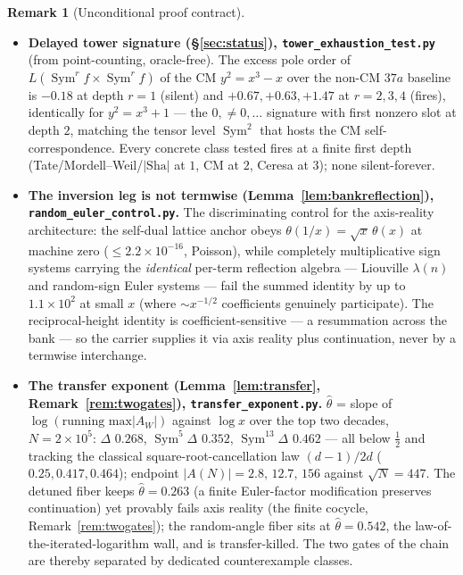 \documentclass[11pt]{article}
\theoremstyle{definition}
\newtheorem{remark}[theorem]{Remark}
\newcommand{\Sym}{\operatorname{Sym}}
\newcommand{\Sha}{\mathrm{Sha}}
\begin{document}
\begin{remark}[Unconditional proof contract]
\begin{enumerate}
\begin{itemize}
\item \textbf{Delayed tower signature (\S\ref{sec:status}), \texttt{tower\_exhaustion\_test.py}}
(from point-counting, oracle-free). The excess pole order of $L(\Sym^r f\times\Sym^r f)$ of the CM
$y^2=x^3-x$ over the non-CM $37a$ baseline is $-0.18$ at depth $r=1$ (silent) and $+0.67,+0.63,+1.47$ at
$r=2,3,4$ (fires), identically for $y^2=x^3+1$ --- the $0,\neq0,\dots$ signature with first nonzero slot
at depth $2$, matching the tensor level $\Sym^2$ that hosts the CM self-correspondence. Every concrete
class tested fires at a finite first depth (Tate/Mordell--Weil/$|\Sha|$ at $1$, CM at $2$, Ceresa at $3$);
none silent-forever.

\item \textbf{The inversion leg is not termwise (Lemma~\ref{lem:bankreflection}),
\texttt{random\_euler\_control.py}.} The discriminating control for the axis-reality architecture: the
self-dual lattice anchor obeys $\theta(1/x)=\sqrt x\,\theta(x)$ at machine zero ($\le2.2\times10^{-16}$,
Poisson), while completely multiplicative sign systems carrying the \emph{identical} per-term reflection
algebra --- Liouville $\lambda(n)$ and random-sign Euler systems --- fail the summed identity by up to
$1.1\times10^{2}$ at small $x$ (where $\sim x^{-1/2}$ coefficients genuinely participate). The
reciprocal-height identity is coefficient-sensitive --- a resummation across the bank --- so the carrier
supplies it via axis reality plus continuation, never by a termwise interchange.

\item \textbf{The transfer exponent (Lemma~\ref{lem:transfer}, Remark~\ref{rem:twogates}),
\texttt{transfer\_exponent.py}.} $\hat\theta$ = slope of $\log(\text{running max}|A_W|)$ against $\log x$
over the top two decades, $N=2\times10^{5}$: $\Delta$ $0.268$, $\Sym^5\Delta$ $0.352$, $\Sym^{13}\Delta$
$0.462$ --- all below $\tfrac12$ and tracking the classical square-root-cancellation law $(d-1)/2d$
($0.25,0.417,0.464$); endpoint $|A(N)|=2.8,\,12.7,\,156$ against $\sqrt N=447$. The detuned fiber keeps
$\hat\theta=0.263$ (a finite Euler-factor modification preserves continuation) yet provably fails axis
reality (the finite cocycle, Remark~\ref{rem:twogates}); the random-angle fiber sits at $\hat\theta=0.542$,
the law-of-the-iterated-logarithm wall, and is transfer-killed. The two gates of the chain are thereby
separated by dedicated counterexample classes.


\end{itemize}
\end{enumerate}
\end{remark}
\end{document}
